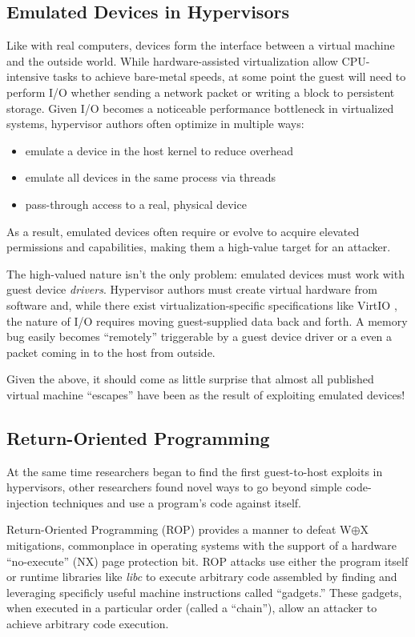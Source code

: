 \documentclass[conference]{IEEEtran}
\begin{document}
\subsection{Emulated Devices in Hypervisors}
Like with real computers, devices form the interface between a virtual
machine and the outside world. While hardware-assisted virtualization
allow CPU-intensive tasks to achieve bare-metal speeds, at some point
the guest will need to perform I/O whether sending a network packet or
writing a block to persistent storage. Given I/O becomes a noticeable
performance bottleneck in virtualized systems, hypervisor authors
often optimize in multiple ways:

\begin{itemize}
\item emulate a device in the host kernel to reduce overhead
\item emulate all devices in the same process via threads
\item pass-through access to a real, physical device
\end{itemize}

As a result, emulated devices often require or evolve to acquire
elevated permissions and capabilities, making them a high-value target
for an attacker.

The high-valued nature isn't the only problem: emulated devices must
work with guest device \emph{drivers}. Hypervisor authors must create
virtual hardware from software and, while there exist
virtualization-specific specifications like VirtIO \cite{b2}, the
nature of I/O requires moving guest-supplied data back and forth. A
memory bug easily becomes ``remotely'' triggerable by a guest device
driver or a even a packet coming in to the host from outside.

Given the above, it should come as little surprise that almost all
published virtual machine ``escapes'' \cite{b3} have been as the
result of exploiting emulated devices!


\subsection{Return-Oriented Programming}
At the same time researchers began to find the first guest-to-host
exploits in hypervisors, other researchers found novel ways to go
beyond simple code-injection techniques and use a program's code
against itself.

Return-Oriented Programming (ROP) \cite{b3} provides a manner to
defeat W$\oplus$X mitigations, commonplace in operating systems with
the support of a hardware ``no-execute'' (NX) page protection bit. ROP
attacks use either the program itself or runtime libraries like
\emph{libc} to execute arbitrary code assembled by finding and
leveraging specificly useful machine instructions called ``gadgets.''
These gadgets, when executed in a particular order (called a
``chain''), allow an attacker to achieve arbitrary code execution.
\end{document}
